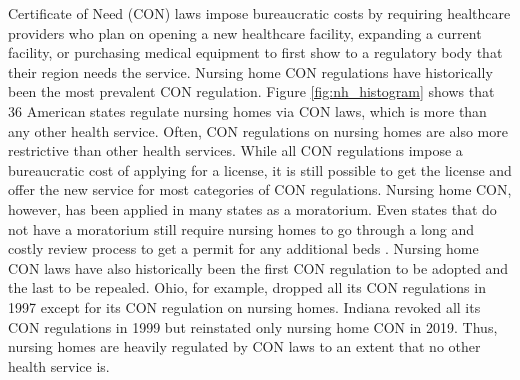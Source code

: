 \documentclass[../Main.tex]{subfiles}
\begin{document}
Certificate of Need (CON) laws impose bureaucratic costs by requiring healthcare providers who plan on opening a new healthcare facility, expanding a current facility, or purchasing medical equipment to first show to a regulatory body that their region needs the service. Nursing home CON regulations have historically been the most prevalent CON regulation. Figure \ref{fig:nh_histogram} shows that 36 American states regulate nursing homes via CON laws, which is more than any other health service. Often, CON regulations on nursing homes are also more restrictive than other health services. While all CON regulations impose a bureaucratic cost of applying for a license, it is still possible to get the license and offer the new service for most categories of CON regulations. Nursing home CON, however, has been applied in many states as a moratorium. Even states that do not have a moratorium still require nursing homes to go through a long and costly review process to get a permit for any additional beds . Nursing home CON laws have also historically been the first CON regulation to be adopted and the last to be repealed. Ohio, for example, dropped all its CON regulations in 1997 except for its CON regulation on nursing homes. Indiana revoked all its CON regulations in 1999 but reinstated only nursing home CON in 2019. Thus, nursing homes are heavily regulated by CON laws to an extent that no other health service is. 
 
\end{document}
